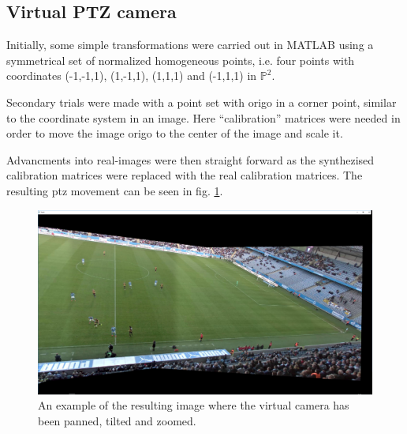 \subsection{Virtual PTZ camera}
Initially, some simple transformations were carried out in MATLAB using a symmetrical set of normalized homogeneous points, i.e. four points with coordinates (-1,-1,1), (1,-1,1), (1,1,1) and (-1,1,1) in $\mathbb{P}^2$.

Secondary trials were made with a point set with origo in a corner point, similar to the coordinate system in an image.
Here ``calibration'' matrices were needed in order to move the image origo to the center of the image and scale it.

Advancments into real-images were then straight forward as the synthezised calibration matrices were replaced with the real calibration matrices.
The resulting ptz movement can be seen in fig. \ref{fig:ptz_res}.

\begin{figure}[H]
	\centering
	\includegraphics[width=0.8\columnwidth]{../results/images/PTZ_res.PNG}
	\caption{An example of the resulting image where the virtual camera has been panned, tilted and zoomed.}
	\label{fig:ptz_res}
\end{figure}

